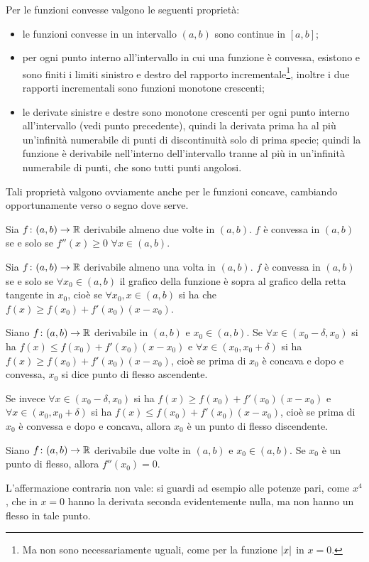 Per le funzioni convesse valgono le seguenti proprietà:
\begin{itemize}
\item le funzioni convesse in un intervallo $(a,b)$ sono continue in $[a,b]$;
\item per ogni punto interno all'intervallo in cui una funzione è convessa, esistono e sono finiti i limiti sinistro e destro del rapporto incrementale\footnote{Ma non sono necessariamente uguali, come per la funzione $\lvert x\rvert$ in $x=0$.}, inoltre i due rapporti incrementali sono funzioni monotone crescenti;
\item le derivate sinistre e destre sono monotone crescenti per ogni punto interno all'intervallo (vedi punto precedente), quindi la derivata prima ha al più un'infinità numerabile di punti di discontinuità solo di prima specie; quindi la funzione è derivabile nell'interno dell'intervallo tranne al più in un'infinità numerabile di punti, che sono tutti punti angolosi.
\end{itemize}
Tali proprietà valgono ovviamente anche per le funzioni concave, cambiando opportunamente verso o segno dove serve.
\begin{proprieta}
Sia $f\colon(a,b)\to\mathbb{R}$ derivabile almeno due volte in $(a,b)$. $f$ è convessa in $(a,b)$ se e solo se $f''(x)\geq 0$ $\forall x\in(a,b)$.
\end{proprieta}
\begin{proprieta}
Sia $f\colon(a,b)\to\mathbb{R}$ derivabile almeno una volta in $(a,b)$. $f$ è convessa in $(a,b)$ se e solo se $\forall x_0\in(a,b)$ il grafico della funzione è sopra al grafico della retta tangente in $x_0$, cioè se $\forall x_0,x\in(a,b)$ si ha che $f(x)\geq f(x_0)+f'(x_0)(x-x_0)$.
\end{proprieta}
\begin{definizione}
Siano $f\colon(a,b)\to\mathbb{R}$ derivabile in $(a,b)$ e $x_0\in(a,b)$. Se $\forall x\in(x_0-\delta,x_0)$ si ha $f(x)\leq f(x_0)+f'(x_0)(x-x_0)$ e $\forall x\in(x_0,x_0+\delta)$ si ha $f(x)\geq f(x_0)+f'(x_0)(x-x_0)$, cioè se prima di $x_0$ è concava e dopo e convessa, $x_0$ si dice punto di flesso ascendente.

Se invece $\forall x\in(x_0-\delta,x_0)$ si ha $f(x)\geq f(x_0)+f'(x_0)(x-x_0)$ e $\forall x\in(x_0,x_0+\delta)$ si ha $f(x)\leq f(x_0)+f'(x_0)(x-x_0)$, cioè se prima di $x_0$ è convessa e dopo e concava, allora $x_0$ è un punto di flesso discendente.
\end{definizione}
\begin{proprieta}
Siano $f\colon(a,b)\to\mathbb{R}$ derivabile due volte in $(a,b)$ e $x_0\in(a,b)$. Se $x_0$ è un punto di flesso, allora $f''(x_0)=0$.
\end{proprieta}
L'affermazione contraria non vale: si guardi ad esempio alle potenze pari, come $x^4$, che in $x=0$ hanno la derivata seconda evidentemente nulla, ma non hanno un flesso in tale punto.

